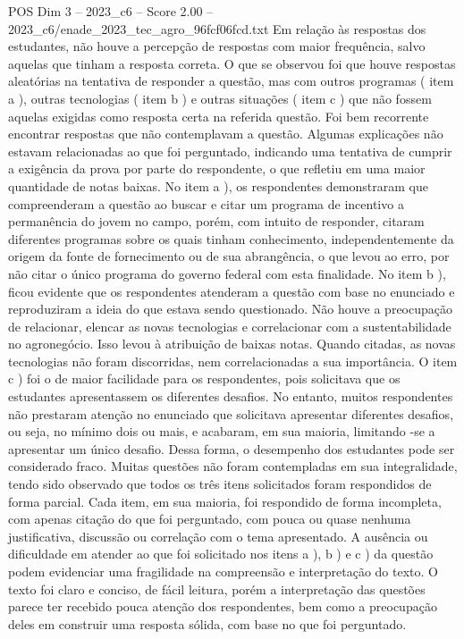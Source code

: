 \begin{textsample}{POS Dim 3 – 2023\_c6 – Score 2.00 – 2023\_c6/enade\_2023\_tec\_agro\_96fcf06fcd.txt}
Em relação às respostas dos estudantes, não houve a percepção de respostas com maior frequência, salvo aquelas que tinham a resposta correta.
O que se observou foi que houve respostas aleatórias na tentativa de responder a questão, mas com outros programas ( item a ), outras tecnologias ( item b ) e outras situações ( item c ) que não fossem aquelas exigidas como resposta certa na referida questão.
Foi bem recorrente encontrar respostas que não contemplavam a questão.
Algumas explicações não estavam relacionadas ao que foi perguntado, indicando uma tentativa de cumprir a exigência da prova por parte do respondente, o que refletiu em uma maior quantidade de notas baixas.
No item a ), os respondentes demonstraram que compreenderam a questão ao buscar e citar um programa de incentivo a permanência do jovem no campo, porém, com intuito de responder, citaram diferentes programas sobre os quais tinham conhecimento, independentemente da origem da fonte de fornecimento ou de sua abrangência, o que levou ao erro, por não citar o único programa do governo federal com esta finalidade.
No item b ), ficou evidente que os respondentes atenderam a questão com base no enunciado e reproduziram a ideia do que estava sendo questionado.
Não houve a preocupação de relacionar, elencar as novas tecnologias e correlacionar com a sustentabilidade no agronegócio.
Isso levou à atribuição de baixas notas.
Quando citadas, as novas tecnologias não foram discorridas, nem correlacionadas a sua importância.
O item c ) foi o de maior facilidade para os respondentes, pois solicitava que os estudantes apresentassem os diferentes desafios.
No entanto, muitos respondentes não prestaram atenção no enunciado que solicitava apresentar diferentes desafios, ou seja, no mínimo dois ou mais, e acabaram, em sua maioria, limitando -se a apresentar um único desafio.
Dessa forma, o desempenho dos estudantes pode ser considerado fraco.
Muitas questões não foram contempladas em sua integralidade, tendo sido observado que todos os três itens solicitados foram respondidos de forma parcial.
Cada item, em sua maioria, foi respondido de forma incompleta, com apenas citação do que foi perguntado, com pouca ou quase nenhuma justificativa, discussão ou correlação com o tema apresentado.
A ausência ou dificuldade em atender ao que foi solicitado nos itens a ), b ) e c ) da questão podem evidenciar uma fragilidade na compreensão e interpretação do texto.
O texto foi claro e conciso, de fácil leitura, porém a interpretação das questões parece ter recebido pouca atenção dos respondentes, bem como a preocupação deles em construir uma resposta sólida, com base no que foi perguntado.

\end{textsample}
